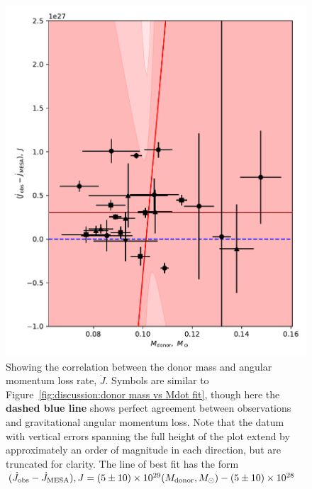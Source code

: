 \begin{figure}
    \centering
    \includegraphics[width=\textwidth]{figures/results/Mdot/Mr_Jdot_ex.pdf}
    \caption{Showing the correlation between the donor mass and angular momentum loss rate, $\dot J$. Symbols are similar to Figure~\ref{fig:discussion:donor mass vs Mdot fit}, though here the {\bf dashed blue line} shows perfect agreement between observations and gravitational angular momentum loss. Note that the datum with vertical errors spanning the full height of the plot extend by approximately an order of magnitude in each direction, but are truncated for clarity. The line of best fit has the form $(\dot J_{\rm obs} - \dot J_{\rm MESA}), J = (5\pm10) \times 10^{29}(M_{\rm donor}, M_\odot) - (5\pm10)\times10^{28}$}
    \label{fig:discussion:donor mass vs Jdot fit}
\end{figure}


